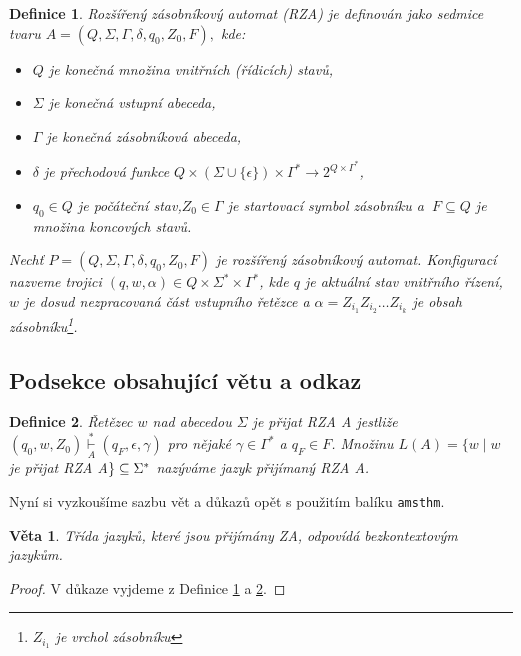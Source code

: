 \documentclass[a4paper, 11pt, twocolumn]{article}
\newtheorem{theorem}{Definice}
\newtheorem{sentence}{Věta}
\begin{document}
\begin{theorem}
\label{proof_1}
\emph{Rozšířený zásobníkový automat (RZA)} je definován jako sedmice tvaru
 $A = (Q, \Sigma, \Gamma, \delta, q_{0}, Z_{0}, F),$
kde:


\begin{itemize}
\item[$\bullet$] $Q$ je konečná množina \emph{vnitřních (řídicích) stavů},
\item[$\bullet$] $\Sigma$ je konečná \emph{vstupní abeceda},
\item[$\bullet$] $\Gamma$ je konečná \emph{zásobníková abeceda},
\item[$\bullet$] $\delta$ je \emph{přechodová funkce} $Q \times(\Sigma \cup\{\epsilon\}) \times \Gamma^{*} \rightarrow 2^{Q \times \Gamma^{*}}$,
\item[$\bullet$] $q_{0} \in Q$ je \emph{počáteční stav},$Z_{0} \in \Gamma$ je \emph{startovací symbol
zásobníku} a $\ F \subseteq Q$ je množina \emph{koncových stavů}.
\end{itemize}

\emph{Nechť $P=\left(Q, \Sigma, \Gamma, \delta, q_{0}, Z_{0}, F\right)$ je rozšířený zásobníkový automat.} Konfigurací \emph{nazveme trojici $(q, w, \alpha) \in
Q \times \Sigma^{*} \times \Gamma^{*}$, kde $q$ je aktuální stav vnitřního řízení,
$w$ je dosud nezpracovaná část vstupního řetězce a $\alpha=
Z_{i_{1}} Z_{i_{2}} \ldots Z_{i_{k}}$ je obsah zásobníku\footnote{$Z_{i_{1}}$ je vrchol zásobníku}}.

\end{theorem}

\subsection{Podsekce obsahující větu a odkaz}
\begin{theorem}
\label{proof_2}
\emph{Řetězec $w$ nad abecedou $\Sigma$ je přijat RZA}
A jestliže $\left(q_{0}, w, Z_{0}\right)\underset{A}{\overset{*}{\vdash}} \left(q_{F}, \epsilon, \gamma\right)$ pro nějaké $\gamma \in \Gamma^{*}$ a $ 
q_{F} \in F$. Množinu $L(A)=\{w \mid w$ je přijat RZA  A$\} \subseteq \\ 
\Sigma^{*}$ nazýváme \emph{jazyk přijímaný RZA} A.
\end{theorem}

Nyní si vyzkoušíme sazbu vět a důkazů opět s použitím
balíku \verb|amsthm|.

\begin{sentence}
Třída jazyků, které jsou přijímány ZA, odpovídá
\emph{bezkontextovým jazykům}.
\end{sentence}
\begin{proof}
V důkaze vyjdeme z Definice \ref{proof_1} a \ref{proof_2}.
\end{proof}
\end{document}
